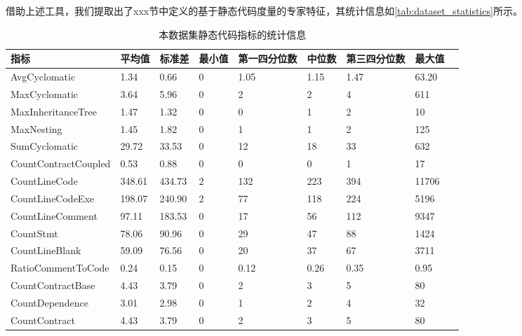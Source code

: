 借助上述工具，我们提取出了xxx节中定义的基于静态代码度量的专家特征，其统计信息如\autoref{tab:dataset_statistics}所示。
\begin{table}[htbp]
    \caption{\label{tab:dataset_statistics}本数据集静态代码指标的统计信息}
    \small
    \renewcommand{\arraystretch}{1.5}
    \begin{tabularx}{\linewidth}
        {p{3cm}<{\centering}X<{\centering}X<{\centering}p{1.5cm}<{\centering}X<{\centering}X<{\centering}X<{\centering}X<{\centering}X<{\centering}}
    \hline
    \textbf{指标}                    & \textbf{平均值}    & \textbf{标准差}    & \textbf{最小值} & \textbf{第一四分位数} & \textbf{中位数}  & \textbf{第三四分位数} & \textbf{最大值}   \\ \hline
    AvgCyclomatic         & 1.34   & 0.66   & 0   & 1.05   & 1.15 & 1.47   & 63.20 \\
    MaxCyclomatic         & 3.64   & 5.96   & 0   & 2      & 2    & 4      & 611   \\
    MaxInheritanceTree    & 1.47   & 1.32   & 0   & 0      & 1    & 2      & 10    \\
    MaxNesting            & 1.45   & 1.82   & 0   & 1      & 1    & 2      & 125   \\
    SumCyclomatic         & 29.72  & 33.53  & 0   & 12     & 18   & 33     & 632   \\
    CountContractCoupled  & 0.53   & 0.88   & 0   & 0      & 0    & 1      & 17    \\ \hline
    CountLineCode         & 348.61 & 434.73 & 2   & 132    & 223  & 394    & 11706 \\
    CountLineCodeExe      & 198.07 & 240.90 & 2   & 77     & 118  & 224    & 5196  \\
    CountLineComment      & 97.11  & 183.53 & 0   & 17     & 56   & 112    & 9347  \\
    CountStmt             & 78.06  & 90.96  & 0   & 29     & 47   & 88     & 1424  \\
    CountLineBlank        & 59.09  & 76.56  & 0   & 20     & 37   & 67     & 3711  \\
    RatioCommentToCode    & 0.24   & 0.15   & 0   & 0.12   & 0.26 & 0.35   & 0.95  \\ \hline
    CountContractBase     & 4.43   & 3.79   & 0   & 2      & 3    & 5      & 80    \\
    CountDependence       & 3.01   & 2.98   & 0   & 1      & 2    & 4      & 32    \\
    CountContract         & 4.43   & 3.79   & 0   & 2      & 3    & 5      & 80    \\

\end{tabularx}
\end{table}
